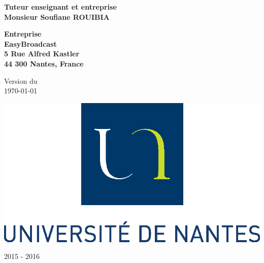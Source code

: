 \begin{titlepage}
\begin{center}
\Large{\textbf{Tuteur enseignant et entreprise}} \\
\Large{\textbf{Monsieur Soufiane ROUIBIA}} 

\vfill

\Large{\textbf{Entreprise}} \\
\LARGE{\textbf{EasyBroadcast} }\\
\Large{\textbf{5 Rue Alfred Kastler\\ 44 300 Nantes, France}} 

\vfill

\large{Version du} \\
\large{\today} 

\vfill

\includegraphics[scale=0.7]{images/logo_ecoles/Universite_de_Nantes_}

\vfill

\large{2015 - 2016}


\end{center}

\end{titlepage}